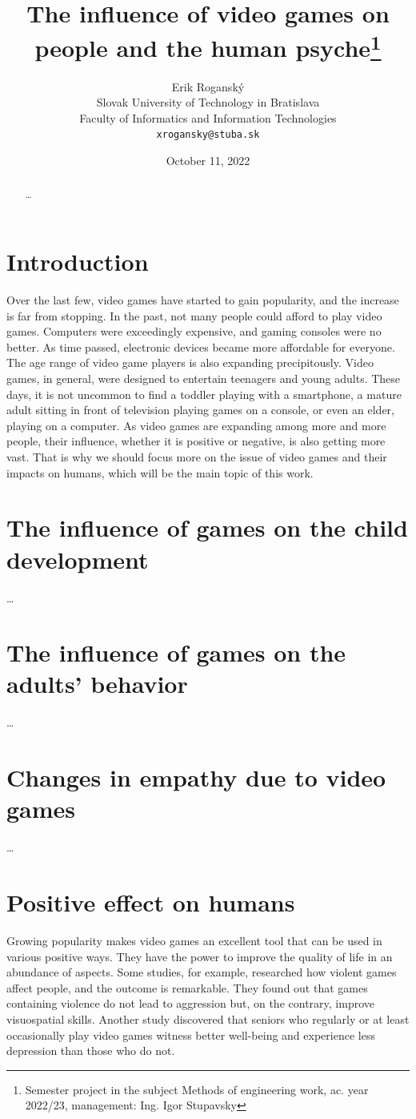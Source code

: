 \documentclass[10pt,twoside,english,a4paper]{article}
\title{The influence of video games on people and the human psyche\thanks{Semester project in the subject Methods of engineering work, ac. year 2022/23, management: Ing. Igor Stupavsky}}
\author{Erik Roganský\\[2pt]
	{\small Slovak University of Technology in Bratislava}\\
	{\small Faculty of Informatics and Information Technologies}\\
	{\small \texttt{xrogansky@stuba.sk}}
	}
\date{\small October 11, 2022}
\begin{document}
\maketitle

\begin{abstract}
\ldots
\end{abstract}



\section{Introduction}
Over the last few, video games have started to gain popularity, and the increase is far from stopping. In the past, not many people could afford to play video games. Computers were exceedingly expensive, and gaming consoles were no better. As time passed, electronic devices became more affordable for everyone. The age range of video game players is also expanding precipitously. Video games, in general, were designed to entertain teenagers and young adults. These days, it is not uncommon to find a toddler playing with a smartphone, a mature adult sitting in front of television playing games on a console, or even an elder, playing on a computer. As video games are expanding among more and more people, their influence, whether it is positive or negative, is also getting more vast. That is why we should focus more on the issue of video games and their impacts on humans, which will be the main topic of this work.

\section{The influence of games on the child development} %
\ldots

\section{The influence of games on the adults' behavior}
\ldots

\section{Changes in empathy due to video games}
\ldots

\section{Positive effect on humans}
Growing popularity makes video games an excellent tool that can be used in various positive ways. They have the power to improve the quality of life in an abundance of aspects. Some studies, for example, researched how violent games affect people, and the outcome is remarkable. They found out that games containing violence do not lead to aggression but, on the contrary, improve visuospatial skills. Another study discovered that seniors who regularly or at least occasionally play video games witness better well-being and experience less depression than those who do not.~\cite{poz-neg-sol}
\end{document}
